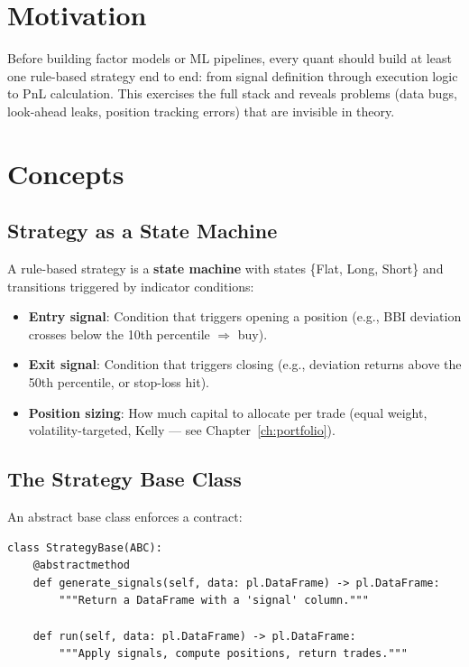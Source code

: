 \documentclass[a4paper, 11pt]{report}
\theoremstyle{definition}
\theoremstyle{remark}
\begin{document}
\section{Motivation}

Before building factor models or ML pipelines, every quant should build at least
one rule-based strategy end to end: from signal definition through execution logic
to PnL calculation.  This exercises the full stack and reveals problems
(data bugs, look-ahead leaks, position tracking errors) that are invisible in
theory.

\section{Concepts}

\subsection{Strategy as a State Machine}

A rule-based strategy is a \textbf{state machine} with states
\{Flat, Long, Short\} and transitions triggered by indicator conditions:

\begin{itemize}
    \item \textbf{Entry signal}: Condition that triggers opening a position
          (e.g., BBI deviation crosses below the 10th percentile $\Rightarrow$
          buy).
    \item \textbf{Exit signal}: Condition that triggers closing
          (e.g., deviation returns above the 50th percentile, or stop-loss
          hit).
    \item \textbf{Position sizing}: How much capital to allocate per trade
          (equal weight, volatility-targeted, Kelly --- see Chapter~\ref{ch:portfolio}).
\end{itemize}

\subsection{The Strategy Base Class}

An abstract base class enforces a contract:

\begin{lstlisting}
class StrategyBase(ABC):
    @abstractmethod
    def generate_signals(self, data: pl.DataFrame) -> pl.DataFrame:
        """Return a DataFrame with a 'signal' column."""

    def run(self, data: pl.DataFrame) -> pl.DataFrame:
        """Apply signals, compute positions, return trades."""
\end{lstlisting}
\end{document}
